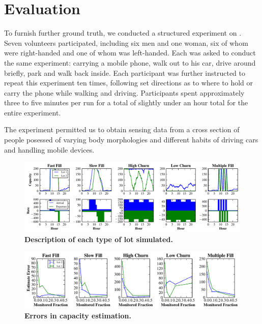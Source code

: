 \section{Evaluation}
\label{sec-evaluation}


To furnish further ground truth, we conducted a structured experiment on
.  Seven volunteers participated, including six men
and one woman, six of whom were right-handed and one of whom was left-handed.
Each was asked to conduct the same experiment:  carrying a mobile phone, walk
out to his car, drive around briefly, park and walk back inside.  Each
participant was further instructed to repeat this experiment ten times,
following set directions as to where to hold or carry the phone while walking
and driving.  Participants spent approximately three to five minutes per run
for a total of slightly under an hour total for the entire experiment.

The experiment permitted us to obtain sensing data from a cross section of
people posessed of varying body morphologies and different habits of driving
cars and handling mobile devices.

\begin{figure}
\centering
\includegraphics[width=\textwidth]{./simulator/figures/lots.pdf}

\caption{\textbf{Description of each type of lot simulated.} }

\label{fig-lotsdescription}
\end{figure}

\begin{figure}
\centering
\includegraphics[width=\textwidth]{./simulator/figures/capacity_experiment.pdf}

\caption{\textbf{Errors in capacity estimation.} }

\label{fig-lotsdescription}
\end{figure}
